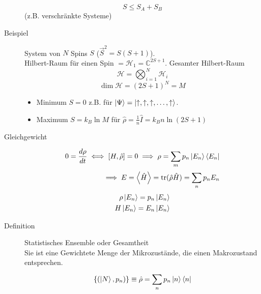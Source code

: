 \documentclass[11pt]{article}
\theoremstyle{plain}
\newcommand{\C}{\mathbb{C}}
\newcommand{\trace}{\operatorname{tr}}
\begin{document}
\begin{description}
  \[ S \le S_A + S_B \] (z.B. verschr\"ankte Systeme)
\item[Beispiel] System von $N$ Spins $S$ ($\vec{S}^2 =  S(S+1)$). \\
  Hilbert-Raum f\"ur einen Spin $= \mathcal{H}_1 = \C^{2S+1}$.
  Gesamter Hilbert-Raum \[ \mathcal{H} = \bigotimes_{i=1}^{N} \mathcal{H}_i \] 
  \[ \operatorname{dim} \mathcal{H} = (2S+1)^N = M \] 
  \begin{itemize}
    \item Minimum $S=0$ z.B. f\"ur $\Ket{\Psi} = \Ket{ \uparrow, \uparrow, \uparrow, \ldots, \uparrow}$.
    \item Maximum $S= k_B \ln{M}$ f\"ur $\hat{\rho}= \frac{1}{n} \hat{I}=
      k_B n \ln{(2S+1)}$
  \end{itemize}
\item[Gleichgewicht]
  \begin{align*}
    0= \frac{d \rho }{dt} \iff \left[ H, \hat{\rho} \right]=0 \implies 
    \rho = \sum_{m}^{} p_n \Ket{E_n} \Bra{E_n} \\
    \implies E = \Braket{\hat{H}} = \trace (\hat{\rho} \hat{H})
    = \sum_{n}^{} p_n E_n
  \end{align*}
  \begin{align*}
    \rho \Ket{E_n} = p_n \Ket{E_n} \\
    H \Ket{E_n} = E_n \Ket{E_n}
  \end{align*}
\end{description}
\begin{description}
  \item[Definition]  Statistisches Ensemble oder Gesamtheit \\
    Sie ist eine Gewichtete Menge der Mikrozust\"ande, die einen 
    Makrozustand entsprechen.
    \begin{align*}
      \left\{ ( \Ket{N}, p_n) \right\} \equiv \hat{\rho} = \sum_{n}^{} p_n
      \Ket{n} \Bra{n} 
    \end{align*}
\end{description}
\end{document}
